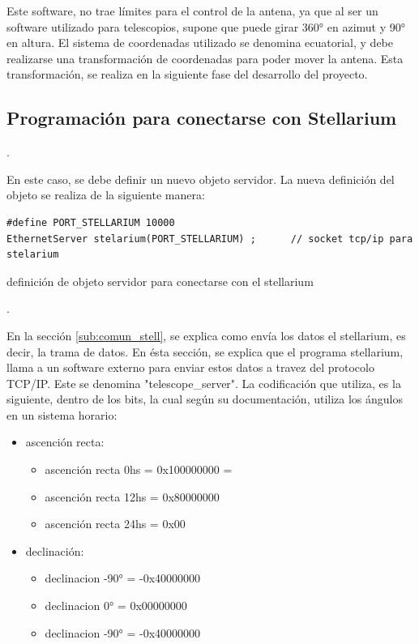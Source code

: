 Este software, no trae límites para el control de la antena, ya que al ser un software utilizado para telescopios, supone que puede girar 360° en azimut y 90° en altura. El sistema de coordenadas utilizado se denomina ecuatorial, y debe realizarse una transformación de coordenadas para poder mover la antena. Esta transformación, se realiza en la siguiente fase del desarrollo del proyecto. 



\subsection{Programación para conectarse con Stellarium}. 

En este caso, se debe definir un nuevo objeto servidor. La nueva definición del objeto se realiza de la siguiente manera: 

\begin{listing}[ht]
	\begin{verbatim}
#define PORT_STELLARIUM 10000
EthernetServer stelarium(PORT_STELLARIUM) ;      // socket tcp/ip para stelarium 
	\end{verbatim}
\caption{definición de objeto servidor para conectarse con el stellarium}. 
\end{listing}

En la sección \ref{sub:comun_stell}, se explica como envía los datos el stellarium, es decir, la trama de datos. En ésta sección, se explica que el programa stellarium, llama a un software externo para enviar estos datos a travez del protocolo TCP/IP. Este se denomina "telescope\_server". La codificación que utiliza, es la siguiente, dentro de los bits, la cual según su documentación, utiliza los ángulos en un sistema horario: 

\begin{itemize}
	\item ascención recta: 
		\begin{itemize}
		 \item	ascención recta 0hs  = 0x100000000 = 		
		 \item	ascención recta 12hs = 0x80000000 
		 \item	ascención recta 24hs = 0x00	
	\end{itemize}
	\item declinación: 
		\begin{itemize}
		  \item	declinacion -90° = -0x40000000
		  \item	declinacion  0°  =  0x00000000
		  \item	declinacion -90° = -0x40000000
		\end{itemize}
\end{itemize}


